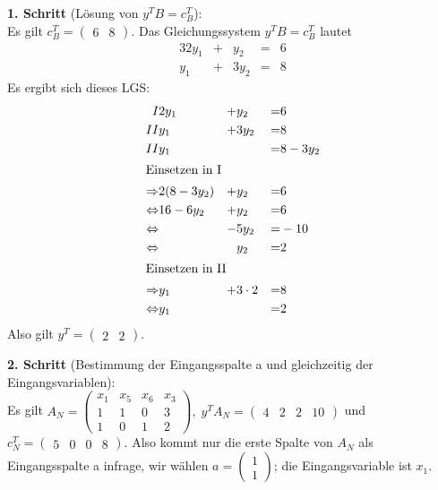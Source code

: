 \documentclass[10pt,a4paper,oneside,ngerman,numbers=noenddot]{scrartcl}
\begin{document}
		\textbf{1. Schritt} (Lösung von $y^{T}B = c_{B}^{T}$):\\
		Es gilt $c_{B}^{T} = \begin{pmatrix} 6 & 8 \end{pmatrix}$. Das Gleichungssystem $y^{T}B = c_{B}^{T}$ lautet
		\begin{alignat*}{3}
			2y_{1} &+& y_{2} &=& 6 \\
			y_{1} &+& 3y_{2} &=& 8
		\end{alignat*}
		Es ergibt sich dieses LGS:
		\begin{alignat*}{3}
			I & 2y_{1} &+& y_{2} &=& 6 \\
			II & y_{1} &+& 3y_{2} &=& 8 \\
			II & y_{1} && &=& 8 - 3y_{2} \\
			\intertext{Einsetzen in I}
			\Rightarrow & 2(8 - 3y_{2}) &+& y_{2} &=& 6 \\
			\Leftrightarrow & 16 - 6y_{2} &+& y_{2} &=& 6 \\
			\Leftrightarrow & &-& 5y_{2} &=& -10 \\
			\Leftrightarrow & && y_{2} &=& 2 \\
			\intertext{Einsetzen in II}
			\Rightarrow & y_{1} &+& 3 \cdot 2 &=& 8 \\
			\Leftrightarrow & y_{1} && &=& 2
		\end{alignat*}
		Also gilt $y^{T} = \begin{pmatrix} 2 & 2 \end{pmatrix}$.
		
		\textbf{2. Schritt} (Bestimmung der Eingangsspalte a und gleichzeitig der Eingangsvariablen):\\
		Es gilt $A_{N} = \begin{pmatrix} x_{1} & x_{5} & x_{6} & x_{3} \\ 1 & 1 & 0 & 3 \\ 1 & 0 & 1 & 2 \end{pmatrix},\; y^{T}A_{N} = \begin{pmatrix} 4 & 2 & 2 & 10 \end{pmatrix}$ und $c_{N}^{T} = \begin{pmatrix} 5 & 0 & 0 & 8\end{pmatrix}$. Also kommt nur die erste Spalte von $A_{N}$ als Eingangsspalte a infrage, wir wählen $a = \begin{pmatrix} 1 \\ 1 \end{pmatrix}$; die Eingangsvariable ist $x_{1}$.
		
\end{document}
